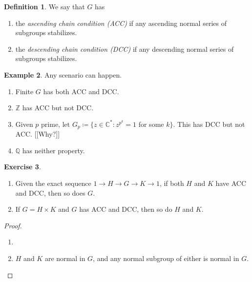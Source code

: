 \documentclass[10pt,letterpaper,cm]{nupset}
\theoremstyle{definition}
\newtheorem{definition}{Definition}[subsection]
\newtheorem{exmp}[definition]{Example}
\theoremstyle{theorem}
\newtheorem{exercise}[definition]{Exercise}
\theoremstyle{remark}
\newcommand{\C}{\mathbb C}
\newcommand{\Q}{\mathbb Q}
\newcommand{\Z}{\mathbb Z}
\newcommand{\1}{\mathbf{1}}
\newcommand{\0}{\vec 0}
\begin{document}
\begin{definition} We say that $G$ has
\begin{enumerate}
\item the \textit{ascending chain condition (ACC)} if any ascending normal series of subgroups stabilizes.
\item the \textit{descending chain condition (DCC)} if any descending normal series of subgroups stabilizes.
\end{enumerate}
\end{definition}

\begin{exmp} Any scenario can happen.
\begin{enumerate}
\item Finite $G$ has both ACC and DCC.
\item $\Z$ has ACC but not DCC.
\item Given $p$ prime, let $G_p \coloneqq  \{z\in \C^{\ast} : z^{p^k} =1$ for some $k \}$. This has DCC but not ACC. {[[Why?]]}
\item $\Q$ has neither property.
\end{enumerate}
\end{exmp}

\begin{exercise} $ $
\begin{enumerate}
\item Given the exact sequence $1 \to H \to G \to K \to 1$, if both $H$ and $K$ have ACC and DCC, then so does $G$. 
\item If $G = H \times K$ and $G$ has ACC and DCC, then so do $H$ and $K$.
\end{enumerate}
\begin{proof} $ $ 
\begin{enumerate}
\item 
\item $H$ and $K$ are normal in $G$, and any normal subgroup of either is normal in $G$.
\end{enumerate}
\end{proof}
\end{exercise}
\end{document}
